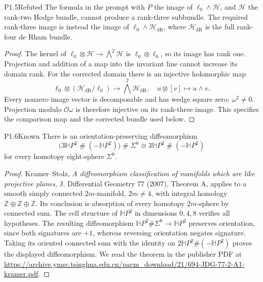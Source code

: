 \begin{statement}{P1.5}{Refuted}
The formula in the prompt with $P$ the image of
$\ell_0\wedge\mathcal H$, and $\mathcal H$ the rank-two Hodge bundle,
cannot produce a rank-three subbundle.  The required rank-three image
is instead the image of $\ell_0\wedge\mathcal H_{\mathrm{dR}}$, where
$\mathcal H_{\mathrm{dR}}$ is the full rank-four de Rham bundle.
\end{statement}
\begin{proof}
The kernel of $\ell_0\otimes\mathcal H\to\bigwedge^2\mathcal H$
is $\ell_0\otimes\ell_0$, so its image has rank one.  Projection and
addition of a map into the invariant line cannot increase its domain
rank.  For the corrected domain there is an injective holomorphic map
\[
\ell_0\otimes(\mathcal H_{\mathrm{dR}}/\ell_0)
 \longrightarrow\bigwedge^2\mathcal H_{\mathrm{dR}},\quad
u\otimes[v]\longmapsto u\wedge v.
\]
Every nonzero image vector is decomposable and has wedge square zero;
$\omega^2\ne0$.  Projection modulo $\mathcal O\omega$ is therefore
injective on its rank-three image.  This specifies the comparison map
and the corrected bundle used below.
\end{proof}

\begin{statement}{P1.6}{Known}
There is an orientation-preserving diffeomorphism
\[
\bigl(3\mathbb HP^2\mathbin{\#}(-\mathbb HP^2)\bigr)\mathbin{\#}\Sigma^8
 \cong 3\mathbb HP^2\mathbin{\#}(-\mathbb HP^2)
\]
for every homotopy eight-sphere $\Sigma^8$.
\end{statement}
\begin{proof}
Kramer--Stolz, \emph{A diffeomorphism classification of manifolds which
are like projective planes}, J. Differential Geometry 77 (2007),
Theorem A, applies to a smooth simply connected $2m$-manifold,
$2m\ne4$, with integral homology $\mathbb Z\oplus\mathbb Z\oplus\mathbb Z$.
Its conclusion is absorption of every homotopy $2m$-sphere by connected
sum.  The cell structure of $\mathbb HP^2$ in dimensions $0,4,8$
verifies all hypotheses.  The resulting diffeomorphism
$\mathbb HP^2\#\Sigma^8\to\mathbb HP^2$ preserves orientation, since
both signatures are $+1$, whereas reversing orientation negates
signature.  Taking its oriented connected sum with the identity on
$2\mathbb HP^2\#(-\mathbb HP^2)$ proves the displayed diffeomorphism.
We read the theorem in the publisher PDF at
\url{https://archive.ymsc.tsinghua.edu.cn/pacm_download/21/694-JDG-77-2-A1-kramer.pdf}.
\end{proof}

